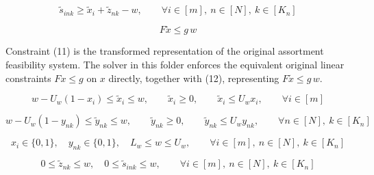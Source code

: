 \documentclass[11pt,a4paper]{article}
\begin{document}
\begin{equation}
\tilde{s}_{ink} \ge \tilde{x}_i + \tilde{z}_{nk} - w,
\qquad \forall i \in [m],\ n \in [N],\ k \in [K_n]
\tag{10}
\end{equation}

\begin{equation}
F \tilde{x} \le g\,w
\tag{11}
\end{equation}

Constraint \textnormal{(11)} is the transformed representation of the original
assortment feasibility system. The solver in this folder enforces the equivalent
original linear constraints $Fx \le g$ on $x$ directly, together with
\textnormal{(12)}, representing $F\tilde{x} \le g\,w$.

\begin{equation}
w - U_w(1-x_i) \le \tilde{x}_i \le w,
\qquad
\tilde{x}_i \ge 0,
\qquad
\tilde{x}_i \le U_w x_i,
\qquad \forall i \in [m]
\tag{12}
\end{equation}

\begin{equation}
w - U_w(1-y_{nk}) \le \tilde{y}_{nk} \le w,
\qquad
\tilde{y}_{nk} \ge 0,
\qquad
\tilde{y}_{nk} \le U_w y_{nk},
\qquad \forall n \in [N],\ k \in [K_n]
\tag{13}
\end{equation}

\begin{equation}
x_i \in \{0,1\},
\quad
y_{nk} \in \{0,1\},
\quad
L_w \le w \le U_w,
\qquad \forall i \in [m],\ n \in [N],\ k \in [K_n]
\tag{14}
\end{equation}

\begin{equation}
0 \le \tilde{z}_{nk} \le w,
\quad
0 \le \tilde{s}_{ink} \le w,
\qquad \forall i \in [m],\ n \in [N],\ k \in [K_n]
\tag{15}
\end{equation}
\end{document}
